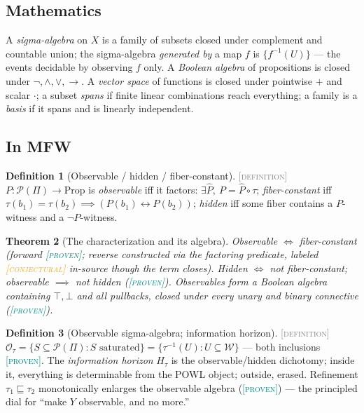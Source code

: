 \documentclass[11pt]{article}
\newcommand{\PROVEN}{\textcolor{teal}{\textsc{[proven]}}}
\newcommand{\DEFINITION}{\textcolor{gray}{\textsc{[definition]}}}
\newcommand{\CONJECTURAL}{\textcolor{orange}{\textsc{[conjectural]}}}
\newcommand{\PT}{\Pi}
\newcommand{\PS}{\mathcal{P}(\PT)}
\newcommand{\WS}{\mathcal{W}}
\theoremstyle{plain}
\newtheorem{theorem}{Theorem}[section]
\theoremstyle{definition}
\newtheorem{definition}[theorem]{Definition}
\theoremstyle{remark}
\begin{document}
\subsection{Mathematics}
A \emph{sigma-algebra} on $X$ is a family of subsets closed under
complement and countable union; the sigma-algebra \emph{generated by} a map
$f$ is $\{f^{-1}(U)\}$ --- the events decidable by observing $f$ only.
A \emph{Boolean algebra} of propositions is closed under
$\neg, \wedge, \vee, \to$. A \emph{vector space} of functions is closed
under pointwise $+$ and scalar $\cdot$; a subset \emph{spans} if finite
linear combinations reach everything; a family is a \emph{basis} if it
spans and is linearly independent.

\subsection{In MFW}
\begin{definition}[Observable / hidden / fiber-constant]\DEFINITION\;
$P : \PS \to \mathrm{Prop}$ is \emph{observable} iff it factors:
$\exists \hat P,\ P = \hat P \circ \tau$; \emph{fiber-constant} iff
$\tau(b_1) = \tau(b_2) \implies (P(b_1) \leftrightarrow P(b_2))$;
\emph{hidden} iff some fiber contains a $P$-witness and a
$\neg P$-witness.
\end{definition}

\begin{theorem}[The characterization and its algebra]
Observable $\iff$ fiber-constant (forward \PROVEN; reverse constructed
via the factoring predicate, labeled \CONJECTURAL{} in-source though the
term closes). Hidden $\iff$ not fiber-constant; observable
$\implies$ not hidden (\PROVEN). Observables form a Boolean algebra
containing $\top, \bot$ and all pullbacks, closed under every unary and
binary connective (\PROVEN).
\end{theorem}

\begin{definition}[Observable sigma-algebra; information horizon]\DEFINITION\;
$\mathcal{O}_\tau = \{S \subseteq \PS : S \text{ saturated}\}
= \{\tau^{-1}(U) : U \subseteq \WS\}$ --- both inclusions \PROVEN. The
\emph{information horizon} $H_\tau$ is the observable/hidden dichotomy;
inside it, everything is determinable from the POWL object; outside,
erased. Refinement $\tau_1 \sqsubseteq \tau_2$ monotonically enlarges the
observable algebra (\PROVEN) --- the principled dial for ``make $Y$
observable, and no more.''
\end{definition}
\end{document}
